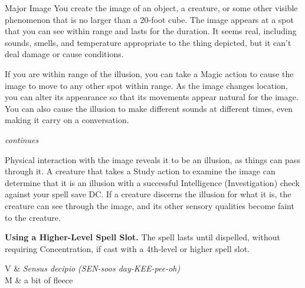 \begin{Spell}[
  tags=Concentration,
  level={3rd},
  time={1 action},
  range={120 ft/20 ft cube},
  components={V, S, M},
  duration={10 minutes},
  school={Illusion},
  attack={INT Check},
  effect={Control}
]{Major Image}
You create the image of an object, a creature, or some other visible phenomenon that is no larger than a 20-foot cube. The image appears at a spot that you can see within range and lasts for the duration. It seems real, including sounds, smells, and temperature appropriate to the thing depicted, but it can't deal damage or cause conditions.

If you are within range of the illusion, you can take a Magic action to cause the image to move to any other spot within range. As the image changes location, you can alter its appearance so that its movements appear natural for the image. You can also cause the illusion to make different sounds at different times, even making it carry on a conversation.

\hfill \textit{\footnotesize continues}
\newpage
{}

Physical interaction with the image reveals it to be an illusion, as things can pass through it. A creature that takes a Study action to examine the image can determine that it is an illusion with a successful Intelligence (Investigation) check against your spell save DC. If a creature discerns the illusion for what it is, the creature can see through the image, and its other sensory qualities become faint to the creature.

\textbf{Using a Higher-Level Spell Slot.} The spell lasts until dispelled, without requiring Concentration, if cast with a 4th-level or higher spell slot.

\begin{components}
V & \textit{Sensus decipio (SEN-soos day-KEE-pee-oh)} \\
M & a bit of fleece
\end{components}
\end{Spell}


